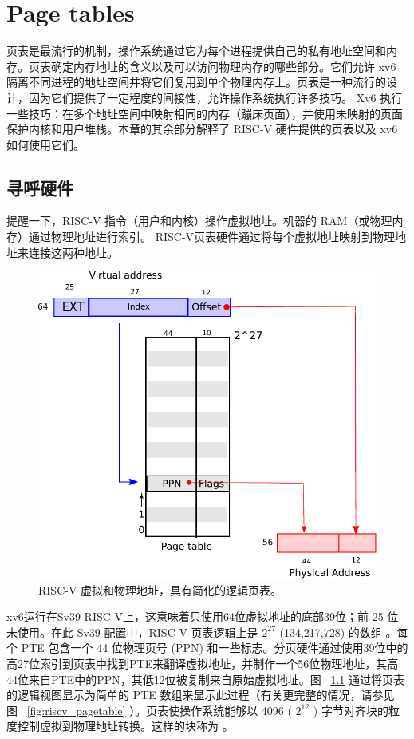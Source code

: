\documentclass[UTF8]{article}
\begin{document}
   \chapter{Page tables}   
    \label{CH:MEM}     

页表是最流行的机制，操作系统通过它为每个进程提供自己的私有地址空间和内存。页表确定内存地址的含义以及可以访问物理内存的哪些部分。它们允许 xv6 隔离不同进程的地址空间并将它们复用到单个物理内存上。页表是一种流行的设计，因为它们提供了一定程度的间接性，允许操作系统执行许多技巧。 Xv6 执行一些技巧：在多个地址空间中映射相同的内存（蹦床页面），并使用未映射的页面保护内核和用户堆栈。本章的其余部分解释了 RISC-V 硬件提供的页表以及 xv6 如何使用它们。
    \section{寻呼硬件  }    提醒一下，RISC-V 指令（用户和内核）操作虚拟地址。机器的 RAM（或物理内存）通过物理地址进行索引。 RISC-V页表硬件通过将每个虚拟地址映射到物理地址来连接这两种地址。  

   \begin{figure}[t]
\center
\includegraphics[scale=0.5]{fig/riscv_address.pdf}
\caption{RISC-V 虚拟和物理地址，具有简化的逻辑页表。  }
\label{fig:riscv_address}
\end{figure}     

xv6运行在Sv39 RISC-V上，这意味着只使用64位虚拟地址的底部39位；前 25 位未使用。在此 Sv39 配置中，RISC-V 页表逻辑上是    $2^{27}$    (134,217,728) 的数组
        。每个 PTE 包含一个 44 位物理页号 (PPN) 和一些标志。分页硬件通过使用39位中的高27位索引到页表中找到PTE来翻译虚拟地址，并制作一个56位物理地址，其高44位来自PTE中的PPN，其低12位被复制来自原始虚拟地址。图~    \ref{fig:riscv_address}    通过将页表的逻辑视图显示为简单的 PTE 数组来显示此过程（有关更完整的情况，请参见图~    \ref{fig:riscv_pagetable}   ）。页表使操作系统能够以 4096 (    $2^{12}$    ) 字节对齐块的粒度控制虚拟到物理地址转换。这样的块称为        。  
\end{document}
